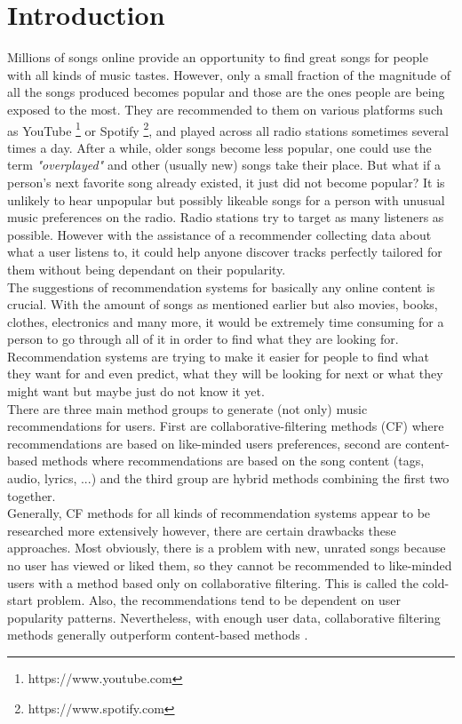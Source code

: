 \chapter{Introduction}

Millions of songs online provide an opportunity to find great songs for people with all kinds of music tastes. However, only a small fraction of the magnitude of all the songs produced becomes popular and those are the ones people are being exposed to the most. They are recommended to them on various platforms such as YouTube \footnote{https://www.youtube.com} or Spotify \footnote{https://www.spotify.com}, and played across all radio stations sometimes several times a day. After a while, older songs become less popular, one could use the term \textit{"overplayed"} and other (usually new) songs take their place. But what if a person's next favorite song already existed, it just did not become popular? It is unlikely to hear unpopular but possibly likeable songs for a person with unusual music preferences on the radio. Radio stations try to target as many listeners as possible. However with the assistance of a recommender collecting data about what a user listens to, it could help anyone discover tracks perfectly tailored for them without being dependant on their popularity.\\
The suggestions of recommendation systems for basically any online content is crucial. With the amount of songs as mentioned earlier but also movies, books, clothes, electronics and many more, it would be extremely time consuming for a person to go through all of it in order to find what they are looking for. Recommendation systems are trying to make it easier for people to find what they want for and even predict, what they will be looking for next or what they might want but maybe just do not know it yet. \\
There are three main method groups to generate (not only) music recommendations for users. First are collaborative-filtering methods (CF) where recommendations are based on like-minded users preferences, second are content-based methods where recommendations are based on the song content (tags, audio, lyrics, ...) and the third group are hybrid methods combining the first two together. \\
Generally, CF methods for all kinds of recommendation systems appear to be researched more extensively \cite{DBLP:journals/corr/abs-1712-07525} however, there are certain drawbacks these approaches. Most obviously, there is a problem with new, unrated songs because no user has viewed or liked them, so they cannot be recommended to like-minded users with a method based only on collaborative filtering. This is called the cold-start problem. Also, the recommendations tend to be dependent on user popularity patterns. Nevertheless, with enough user data, collaborative filtering methods generally outperform content-based methods \cite{van2013deep}. \\
